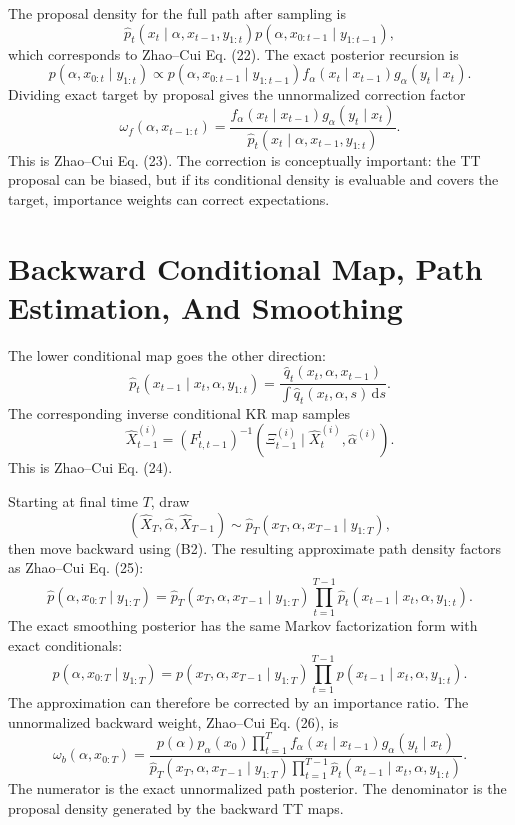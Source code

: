 \documentclass[11pt]{article}
\newcommand{\dd}{\,\mathrm d}
\begin{document}
The proposal density for the full path after sampling is
\[
    \widehat p_t(x_t\mid \alpha,x_{t-1},y_{1:t})
    p(\alpha,x_{0:t-1}\mid y_{1:t-1}),
    \tag{F3}
\]
which corresponds to Zhao--Cui Eq. (22).  The exact posterior recursion is
\[
    p(\alpha,x_{0:t}\mid y_{1:t})
    \propto
    p(\alpha,x_{0:t-1}\mid y_{1:t-1})
    f_\alpha(x_t\mid x_{t-1})
    g_\alpha(y_t\mid x_t).
\]
Dividing exact target by proposal gives the unnormalized correction factor
\[
    \omega_f(\alpha,x_{t-1:t})
    =
    \frac{
    f_\alpha(x_t\mid x_{t-1})g_\alpha(y_t\mid x_t)}
    {\widehat p_t(x_t\mid \alpha,x_{t-1},y_{1:t})}.
    \tag{F4}
\]
This is Zhao--Cui Eq. (23).  The correction is conceptually important: the TT
proposal can be biased, but if its conditional density is evaluable and covers
the target, importance weights can correct expectations.

\section{Backward Conditional Map, Path Estimation, And Smoothing}

The lower conditional map goes the other direction:
\[
    \widehat p_t(x_{t-1}\mid x_t,\alpha,y_{1:t})
    =
    \frac{\widehat q_t(x_t,\alpha,x_{t-1})}
    {\int \widehat q_t(x_t,\alpha,s)\dd s}.
    \tag{B1}
\]
The corresponding inverse conditional KR map samples
\[
    \widehat X_{t-1}^{(i)}
    =
    (F_{t,t-1}^{l})^{-1}
    \left(\Xi_{t-1}^{(i)}\mid \widehat X_t^{(i)},\widehat\alpha^{(i)}\right).
    \tag{B2}
\]
This is Zhao--Cui Eq. (24).

Starting at final time \(T\), draw
\[
    (\widehat X_T,\widehat\alpha,\widehat X_{T-1})
    \sim
    \widehat p_T(x_T,\alpha,x_{T-1}\mid y_{1:T}),
\]
then move backward using (B2).  The resulting approximate path density factors
as Zhao--Cui Eq. (25):
\[
    \widehat p(\alpha,x_{0:T}\mid y_{1:T})
    =
    \widehat p_T(x_T,\alpha,x_{T-1}\mid y_{1:T})
    \prod_{t=1}^{T-1}
    \widehat p_t(x_{t-1}\mid x_t,\alpha,y_{1:t}).
    \tag{B3}
\]
The exact smoothing posterior has the same Markov factorization form with exact
conditionals:
\[
    p(\alpha,x_{0:T}\mid y_{1:T})
    =
    p(x_T,\alpha,x_{T-1}\mid y_{1:T})
    \prod_{t=1}^{T-1}
    p(x_{t-1}\mid x_t,\alpha,y_{1:t}).
    \tag{B4}
\]
The approximation can therefore be corrected by an importance ratio.  The
unnormalized backward weight, Zhao--Cui Eq. (26), is
\[
    \omega_b(\alpha,x_{0:T})
    =
    \frac{
    p(\alpha)p_\alpha(x_0)
    \prod_{t=1}^{T}
    f_\alpha(x_t\mid x_{t-1})g_\alpha(y_t\mid x_t)}
    {
    \widehat p_T(x_T,\alpha,x_{T-1}\mid y_{1:T})
    \prod_{t=1}^{T-1}
    \widehat p_t(x_{t-1}\mid x_t,\alpha,y_{1:t})}.
    \tag{B5}
\]
The numerator is the exact unnormalized path posterior.  The denominator is the
proposal density generated by the backward TT maps.
\end{document}
